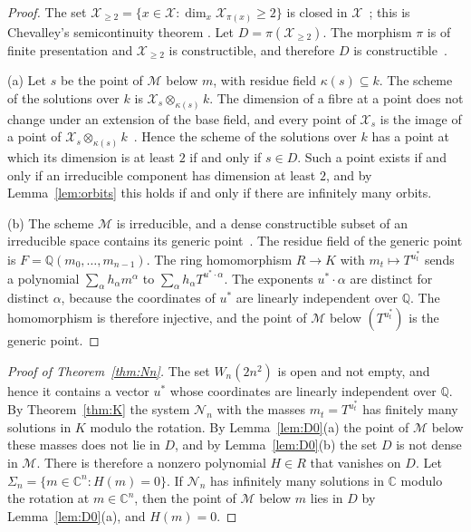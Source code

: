 \documentclass[11pt]{amsart}
\theoremstyle{definition}
\theoremstyle{remark}
\numberwithin{equation}{section}
\newcommand{\QQ}{\mathbb{Q}}
\newcommand{\CC}{\mathbb{C}}
\newcommand{\cN}{\mathcal{N}}
\newcommand{\cX}{\mathcal{X}}
\newcommand{\cM}{\mathcal{M}}
\begin{document}
\begin{proof}
The set $\cX_{\ge 2} = \{ x \in \cX : \dim_x \cX_{\pi(x)} \ge 2 \}$ is closed in
$\cX$~\cite[Tag~02FZ]{stacks}; this is Chevalley's semicontinuity theorem \cite[13.1.3]{ega4iii}. Let
$D = \pi(\cX_{\ge 2})$. The morphism $\pi$ is of finite presentation and $\cX_{\ge 2}$ is constructible,
and therefore $D$ is constructible~\cite[Tag~054K]{stacks}.

(a) Let $s$ be the point of $\cM$ below $m$, with residue field $\kappa(s) \subseteq k$. The scheme of
the solutions over $k$ is $\cX_s \otimes_{\kappa(s)} k$. The dimension of a fibre at a point does not
change under an extension of the base field, and every point of $\cX_s$ is the image of a point of
$\cX_s \otimes_{\kappa(s)} k$~\cite[Tag~02FY]{stacks}. Hence the scheme of the solutions over $k$ has a
point at which its dimension is at least $2$ if and only if $s \in D$. Such a point exists if and only
if an irreducible component has dimension at least $2$, and by Lemma~\ref{lem:orbits} this holds if and
only if there are infinitely many orbits.

(b) The scheme $\cM$ is irreducible, and a dense constructible subset of an irreducible space contains
its generic point~\cite[Tag~005K]{stacks}. The residue field of the generic point is
$F = \QQ(m_0, \dots, m_{n-1})$. The ring homomorphism $R \to K$ with $m_t \mapsto T^{u^{*}_t}$ sends a
polynomial $\sum_{\alpha} h_\alpha m^{\alpha}$ to $\sum_{\alpha} h_\alpha T^{u^{*} \cdot \alpha}$. The
exponents $u^{*} \cdot \alpha$ are distinct for distinct $\alpha$, because the coordinates of $u^{*}$ are
linearly independent over $\QQ$. The homomorphism is therefore injective, and the point of $\cM$ below
$(T^{u^{*}_t})$ is the generic point.
\end{proof}

\begin{proof}[Proof of Theorem~\ref{thm:Nn}]
The set $W_n(2n^2)$ is open and not empty, and hence it contains a vector $u^{*}$ whose coordinates are
linearly independent over $\QQ$. By Theorem~\ref{thm:K} the system $\cN_n$ with the masses
$m_t = T^{u^{*}_t}$ has finitely many solutions in $K$ modulo the rotation. By Lemma~\ref{lem:D0}(a) the
point of $\cM$ below these masses does not lie in $D$, and by Lemma~\ref{lem:D0}(b) the set $D$ is not
dense in $\cM$. There is therefore a nonzero polynomial $H \in R$ that vanishes on $D$. Let
$\Sigma_n = \{ m \in \CC^n : H(m) = 0 \}$. If $\cN_n$ has infinitely many solutions in $\CC$ modulo the
rotation at $m \in \CC^n$, then the point of $\cM$ below $m$ lies in $D$ by Lemma~\ref{lem:D0}(a), and
$H(m) = 0$.
\end{proof}
\end{document}

